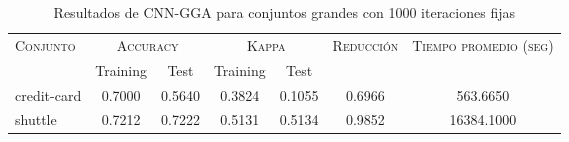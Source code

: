 \begin{table}[]
\centering
\begin{tabular}{l c c c c c c}
\hline
\multirow{2}{*}{\textsc{Conjunto}}
	& \multicolumn{2}{c}{\textsc{Accuracy}}
	& \multicolumn{2}{c}{\textsc{Kappa}}
	& \textsc{Reducción}
	& \textsc{Tiempo promedio (seg)} \\
	& Training & Test
	& Training & Test \\ 
\hline
\hline

credit-card & 0.7000 & 0.5640 & 0.3824 & 0.1055 & 0.6966 & 563.6650 \\
shuttle & 0.7212 & 0.7222 & 0.5131 & 0.5134 & 0.9852 & 16384.1000 \\

\hline
\end{tabular}
\caption{Resultados de CNN-GGA para conjuntos grandes con 1000 iteraciones fijas}
\label{res-grande-cnn-gga}
\end{table}

